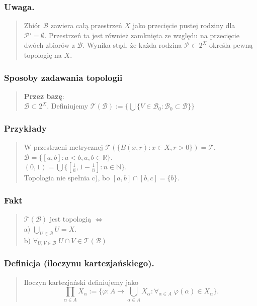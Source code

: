 \documentclass[10pt,a4paper]{article}
\begin{document}
{    \subsubsection*{Uwaga.}
    \begin{quote}
    Zbiór $\mathcal{B}$ zawiera całą przestrzeń $X$ jako przecięcie pustej rodziny dla $\mathcal{P}' = \emptyset$. Przestrzeń ta jest również zamknięta ze względu na przecięcie dwóch zbiorów z $\mathcal{B}$. Wynika stąd, że każda rodzina $\mathcal{P} \subset 2^X$ określa pewną topologię na $X$.
    \end{quote}

    \subsubsection*{Sposoby zadawania topologii}
    \begin{quote}
    \textbf{Przez bazę}: \\
    $\mathcal{B} \subset 2^X$. Definiujemy $\mathcal{T}(\mathcal{B}) := \{\bigcup \{V \in \mathcal{B}_0 : \mathcal{B}_0 \subset \mathcal{B}\}\}$
    \end{quote}

    \subsubsection*{Przykłady}
    \begin{quote}
    W przestrzeni metrycznej $\mathcal{T}(\{B(x, r) : x \in X, r > 0\}) = \mathcal{T}$. \\
    $\mathcal{B} = \{[a, b] : a < b, a, b \in \mathbb{R}\}$. \\
    $(0, 1) = \bigcup \{[\frac{1}{n}, 1 - \frac{1}{n}] : n \in \mathbb{N}\}$. \\
    Topologia nie spełnia c), bo $[a, b] \cap [b, c] = \{b\}$.
    \end{quote}

    \subsubsection*{Fakt}
    \begin{quote}
    $\mathcal{T}(\mathcal{B})$ jest topologią $\iff$ \\
    a) $\bigcup_{U \in \mathcal{B}} U = X$. \\
    b) $\forall_{U, V \in \mathcal{B}} \; U \cap V \in \mathcal{T}(\mathcal{B})$
    \end{quote}

    \subsubsection*{Definicja (iloczynu kartezjańskiego).}
    \begin{quote}
    Iloczyn kartezjański definiujemy jako \\
    $$\prod_{\alpha \in A} X_{\alpha} := \{\varphi : A \to \bigcup_{\alpha \in A} X_{\alpha} : \forall_{\alpha \in A} \; \varphi(\alpha) \in X_{\alpha}\}.$$
    \end{quote}

}
\end{document}
